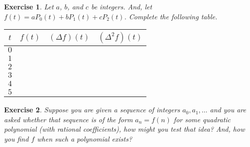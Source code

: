 \documentclass[12pt]{article}
\theoremstyle{plain}
\newtheorem{ex}{Exercise}
\begin{document}
\begin{ex}
  Let $a$, $b$, and $c$ be integers. And, let $f(t)=aP_0(t)+bP_1(t)+cP_2(t)$. Complete the following table.
  \begin{center}
    \begin{tabular}{| c | c | c | c |} \hline
      $t$ & $f(t)$   & $(\Delta f)(t)$ & $(\Delta^2 f)(t)$ \\ \hline
      $0$ &          &                 &                   \\ \hline
      $1$ &          &                 &                   \\ \hline
      $2$ &          &                 &                   \\ \hline
      $3$ &          &                 &                   \\ \hline
      $4$ &          &                 &                   \\ \hline
      $5$ &          &                 &                   \\ \hline
    \end{tabular}
  \end{center}
\end{ex}

\begin{ex}
  Suppose you are given a sequence of integers $a_0,a_1,\ldots$ and you are asked whether that sequence is of the form $a_n=f(n)$ for some quadratic polynomial (with rational coefficients), how might you test that idea? And, how you find $f$ when such a polynomial exists?
\end{ex}
\end{document}
